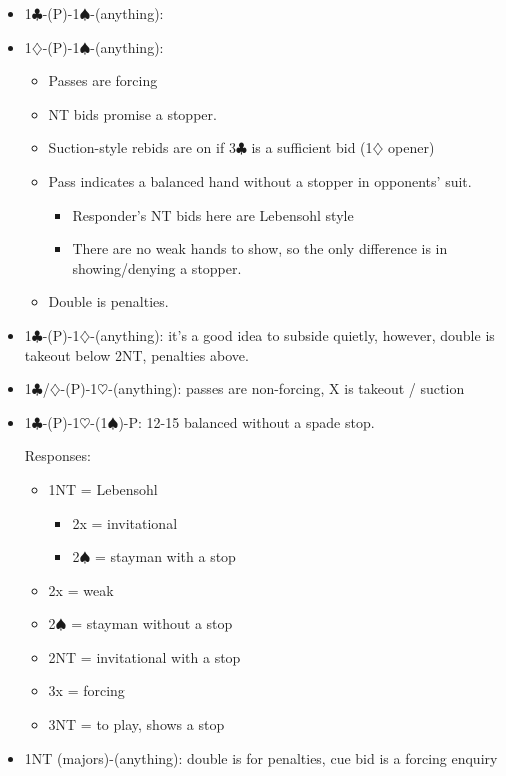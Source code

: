\documentclass[a4paper,14pt]{extarticle}
\begin{document}
\begin{itemize}
\item 1$\clubsuit$-(P)-1$\spadesuit$-(anything):
\item 1$\diamondsuit$-(P)-1$\spadesuit$-(anything):
\begin{itemize}
   \item Passes are forcing
   \item NT bids promise a stopper.
   \item Suction-style rebids are on if 3$\clubsuit$ is a sufficient bid (1$\diamondsuit$ opener)
   \item Pass indicates a balanced hand without a stopper in opponents' suit.
	\begin{itemize}
      \item Responder's NT bids here are Lebensohl style 
      \item There are no weak hands to show, so the only difference is in showing/denying a stopper.
	\end{itemize}
   \item Double is penalties.
\end{itemize}

\item 1$\clubsuit$-(P)-1$\diamondsuit$-(anything): it's a good idea to subside quietly, however, double is takeout below 2NT, penalties above.

\item 1$\clubsuit$/$\diamondsuit$-(P)-1$\heartsuit$-(anything): passes are non-forcing, X is takeout / suction

\item 1$\clubsuit$-(P)-1$\heartsuit$-(1$\spadesuit$)-P: 12-15 balanced without a spade stop.

Responses:
	\begin{itemize}
	\item 1NT = Lebensohl
		\begin{itemize}
		\item 2x = invitational
		\item 2$\spadesuit$ = stayman with a stop
		\end{itemize}
	\item 2x = weak
	\item 2$\spadesuit$ = stayman without a stop
	\item 2NT = invitational with a stop
	\item 3x = forcing
	\item 3NT = to play, shows a stop
	\end{itemize}

\item 1NT (majors)-(anything): double is for penalties, cue bid is a forcing enquiry

\end{itemize}
\end{document}
